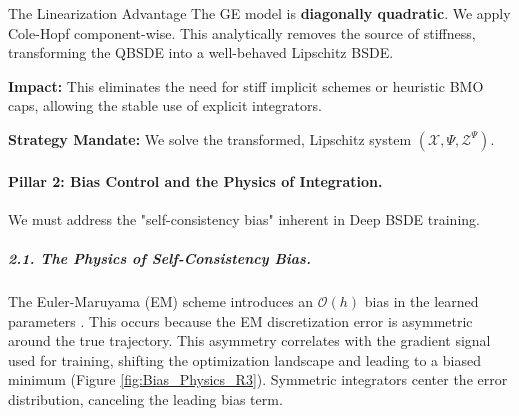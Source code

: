 \documentclass[11pt,letterpaper,oneside]{article}
\theoremstyle{plain}
\theoremstyle{definition}
\theoremstyle{remark}
\begin{document}
\begin{distillresult}{The Linearization Advantage}
The GE model is \textbf{diagonally quadratic}. We apply Cole-Hopf component-wise. This analytically removes the source of stiffness, transforming the QBSDE into a well-behaved Lipschitz BSDE.
\end{distillresult}

\textbf{Impact:} This eliminates the need for stiff implicit schemes or heuristic BMO caps, allowing the stable use of explicit integrators.

\textbf{Strategy Mandate:} We solve the transformed, Lipschitz system $(\mathcal{X}, \Psi, \mathcal{Z}^\Psi)$.

\paragraph{Pillar 2: Bias Control and the Physics of Integration.}

We must address the "self-consistency bias" inherent in Deep BSDE training.

\subparagraph{2.1. The Physics of Self-Consistency Bias.}
The Euler-Maruyama (EM) scheme introduces an $\mathcal{O}(h)$ bias in the learned parameters \cite{ParkTu2025}. This occurs because the EM discretization error is asymmetric around the true trajectory. This asymmetry correlates with the gradient signal used for training, shifting the optimization landscape and leading to a biased minimum (Figure \ref{fig:Bias_Physics_R3}). Symmetric integrators center the error distribution, canceling the leading bias term.
\end{document}
